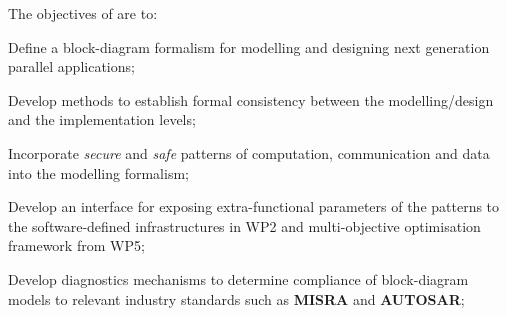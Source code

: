 \addtocounter{wpno}{1}
\begin{Workpackage}{\thewpno}
\WPTitle{\wpname{\thewpno}}


\begin{WPObjectives}
The objectives of \theWP{} are to:
\begin{compactitem}
\item Define a block-diagram formalism for modelling and designing next generation parallel applications;
\item Develop methods to %
  establish formal consistency between the modelling/design
  and the implementation levels;
\item Incorporate \emph{secure} and \emph{safe} patterns of computation, communication and data into the modelling formalism;
\item Develop an interface for exposing extra-functional parameters of the patterns to the software-defined infrastructures in WP2 and multi-objective optimisation framework from WP5;
\item Develop diagnostics mechanisms to determine compliance of block-diagram models to relevant industry standards such as \textbf{MISRA} and \textbf{AUTOSAR};



\end{compactitem}
\end{WPObjectives}
\end{Workpackage}
